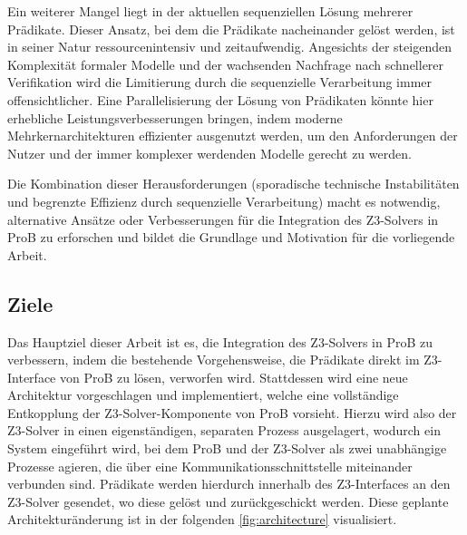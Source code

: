 Ein weiterer Mangel liegt in der aktuellen sequenziellen Lösung mehrerer Prädikate.
Dieser Ansatz, bei dem die Prädikate nacheinander gelöst werden,
ist in seiner Natur ressourcenintensiv und zeitaufwendig.
Angesichts der steigenden Komplexität formaler Modelle und der wachsenden Nachfrage nach schnellerer Verifikation wird die Limitierung durch die sequenzielle Verarbeitung immer offensichtlicher.
Eine Parallelisierung der Lösung von Prädikaten könnte hier erhebliche Leistungsverbesserungen bringen,
indem moderne Mehrkernarchitekturen effizienter ausgenutzt werden,
um den Anforderungen der Nutzer und der immer komplexer werdenden Modelle gerecht zu werden.

Die Kombination dieser Herausforderungen (sporadische technische Instabilitäten und begrenzte Effizienz durch sequenzielle Verarbeitung) macht es notwendig,
alternative Ansätze oder Verbesserungen für die Integration des Z3-Solvers in ProB zu erforschen und
bildet die Grundlage und Motivation für die vorliegende Arbeit.

\subsection{Ziele}

Das Hauptziel dieser Arbeit ist es, die Integration des Z3-Solvers in ProB zu verbessern,
indem die bestehende Vorgehensweise, die Prädikate direkt im Z3-Interface von ProB zu lösen, verworfen wird.
Stattdessen wird eine neue Architektur vorgeschlagen und implementiert,
welche eine vollständige Entkopplung der Z3-Solver-Komponente von ProB vorsieht.
Hierzu wird also der Z3-Solver in einen eigenständigen, separaten Prozess ausgelagert,
wodurch ein System eingeführt wird, bei dem ProB und der Z3-Solver als zwei unabhängige Prozesse agieren,
die über eine Kommunikationsschnittstelle miteinander verbunden sind.
Prädikate werden hierdurch innerhalb des Z3-Interfaces an den Z3-Solver gesendet, wo diese gelöst und zurückgeschickt werden.
Diese geplante Architekturänderung ist in der folgenden \cref{fig:architecture} visualisiert.
\newline

